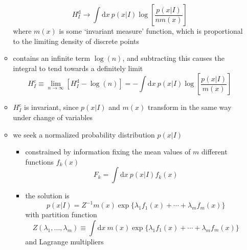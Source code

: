 \documentclass[../jaynes_prob_theory_notes.tex]{subfiles}
\begin{document}
\begin{itemize}
\begin{itemize}
\begin{equation*}
                                H^{\text{d}}_{I} \rightarrow \int \mathrm{d}x~p(x|I)\log \left[ \frac{p(x|I)}{nm(x)} \right]
                            \end{equation*}
                            where \( m(x) \) is some `invariant measure' function, which is proportional to the limiting density of discrete points
                        \item contains an infinite term \( \log (n) \), and subtracting this causes the integral to tend towards a definitely limit
                            \begin{equation*} 
                                H^{\text{c}}_{I} \equiv \lim_{n \rightarrow \infty} [H^{\text{d}}_{I} - \log (n) ] = - \int \mathrm{d}x~p(x|I) \log \left[ \frac{p(x|I)}{m(x)} \right]
                            \end{equation*}
                        \item \( H^{\text{c}}_{I} \) is invariant, since \( p(x|I) \) and \( m(x) \) transform in the same way under change of variables
                        \item we seek a normalized probability distribution \( p(x|I) \)
                            \begin{itemize} 
                                \item constrained by information fixing the mean values of \( m \) different functions \( f_k (x) \)
                                    \begin{equation*} 
                                        F_k = \int \mathrm{d}x~p(x|I) f_k (x)
                                    \end{equation*}
                                \item the solution is
                                    \begin{equation*} 
                                        p(x|I) = Z^{-1} m(x) \exp \{\lambda_1 f_1 (x) + \cdots + \lambda_m f_m (x) \}
                                    \end{equation*}
                                    with partition function
                                    \begin{equation*} 
                                        Z(\lambda_1, \ldots, \lambda_m) \equiv \int \mathrm{d}x~m(x) \exp \{\lambda_1 f_1 (x) + \cdots + \lambda_m f_m (x) \}
                                    \end{equation*}
                                    and Lagrange multipliers

\end{itemize}
\end{itemize}
\end{itemize}
\end{document}
